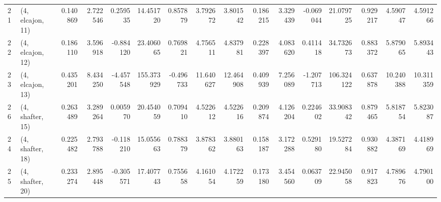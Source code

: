 \begin{tabular}{llrrrrrrrrrrrrrr}
21 &  (4, elcajon, 11) &   0.140869 &  2.722546 &  0.259535 &   14.451720 &  0.857879 &   3.792672 &   3.801542 &  0.186215 &   3.329439 & -0.069044 &   21.079725 &  0.929217 &   4.590747 &   4.591266 \\
22 &  (4, elcajon, 12) &   0.186110 &  3.596918 & -0.884120 &   23.406065 &  0.769821 &   4.756511 &   4.837981 &  0.228397 &   4.083620 &  0.411418 &   34.732673 &  0.883372 &   5.879065 &   5.893443 \\
23 &  (4, elcajon, 13) &   0.435201 &  8.434250 & -4.457548 &  155.373929 & -0.496733 &  11.640627 &  12.464908 &  0.409939 &   7.256089 & -1.207713 &  106.324122 &  0.637878 &  10.240388 &  10.311359 \\
26 &  (4, shafter, 15) &   0.263489 &  3.289264 &  0.005970 &   20.454059 &  0.709410 &   4.522612 &   4.522616 &  0.209874 &   4.126204 &  0.224602 &   33.908342 &  0.879465 &   5.818754 &   5.823087 \\
24 &  (4, shafter, 18) &   0.225482 &  2.793788 & -0.118210 &   15.055663 &  0.788379 &   3.878362 &   3.880163 &  0.158187 &   3.172288 &  0.529180 &   19.527284 &  0.930882 &   4.387169 &   4.418969 \\
25 &  (4, shafter, 20) &   0.233274 &  2.895448 & -0.305571 &   17.407743 &  0.755658 &   4.161054 &   4.172259 &  0.173180 &   3.454560 &  0.063709 &   22.945058 &  0.917823 &   4.789676 &   4.790100 \\
\bottomrule
\end{tabular}
